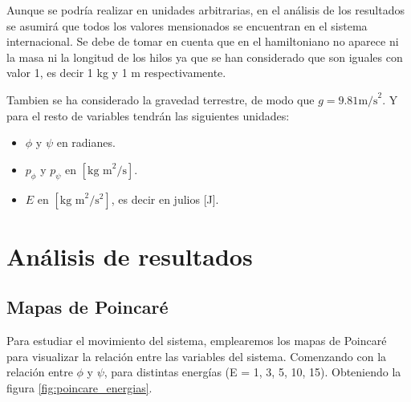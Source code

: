 \documentclass[11pt, twoside]{article} %
\begin{document}
Aunque se podría realizar en unidades arbitrarias, en el análisis 
de los resultados se asumirá que todos los valores mensionados se 
encuentran en el sistema internacional. Se debe de tomar en cuenta que 
en el hamiltoniano no aparece ni la masa ni la longitud de los hilos 
ya que se han considerado que son iguales con valor 1, es decir 1 kg y 
1 m respectivamente. 

Tambien se ha considerado la gravedad terrestre, de modo que 
$g = 9.81 \text{m/s}^2$. Y para el resto de variables tendrán las 
siguientes unidades:

\begin{itemize}
    \item $\phi$ y $\psi$ en radianes.
    \item $p_\phi$ y $p_\psi$ en $[\text{kg m}^2/\text{s}]$.
    \item $E$ en $[\text{kg m}^2/\text{s}^2]$, es decir en julios [J].
\end{itemize}


\newpage
\section{Análisis de resultados}

\subsection{Mapas de Poincaré}

Para estudiar el movimiento del sistema, emplearemos los mapas de 
Poincaré para visualizar la relación entre las variables del sistema. 
Comenzando con la relación entre $\phi$ y $\psi$, para distintas 
energías (E = 1, 3, 5, 10, 15). Obteniendo la figura 
\ref{fig:poincare_energias}.
\end{document}
